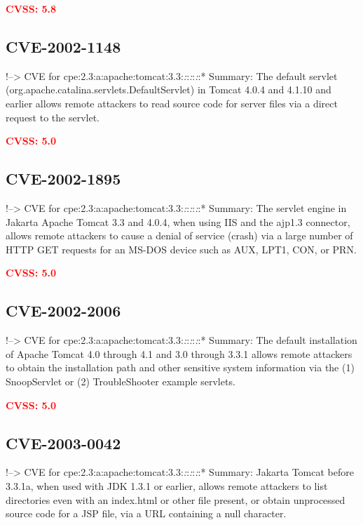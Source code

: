 \documentclass[a4paper, 12pt]{article}
\begin{document}
\textbf{\textcolor{red}{CVSS: 5.8}}

\hypertarget{cve-2002-1148}{%
\subsection{CVE-2002-1148}\label{cve-2002-1148}}

!--\textgreater{} CVE for
cpe:2.3:a:apache:tomcat:3.3:\emph{:}:\emph{:}:\emph{:}:* Summary: The
default servlet (org.apache.catalina.servlets.DefaultServlet) in Tomcat
4.0.4 and 4.1.10 and earlier allows remote attackers to read source code
for server files via a direct request to the servlet.

\textbf{\textcolor{red}{CVSS: 5.0}}

\hypertarget{cve-2002-1895}{%
\subsection{CVE-2002-1895}\label{cve-2002-1895}}

!--\textgreater{} CVE for
cpe:2.3:a:apache:tomcat:3.3:\emph{:}:\emph{:}:\emph{:}:* Summary: The
servlet engine in Jakarta Apache Tomcat 3.3 and 4.0.4, when using IIS
and the ajp1.3 connector, allows remote attackers to cause a denial of
service (crash) via a large number of HTTP GET requests for an MS-DOS
device such as AUX, LPT1, CON, or PRN.

\textbf{\textcolor{red}{CVSS: 5.0}}

\hypertarget{cve-2002-2006}{%
\subsection{CVE-2002-2006}\label{cve-2002-2006}}

!--\textgreater{} CVE for
cpe:2.3:a:apache:tomcat:3.3:\emph{:}:\emph{:}:\emph{:}:* Summary: The
default installation of Apache Tomcat 4.0 through 4.1 and 3.0 through
3.3.1 allows remote attackers to obtain the installation path and other
sensitive system information via the (1) SnoopServlet or (2)
TroubleShooter example servlets.

\textbf{\textcolor{red}{CVSS: 5.0}}

\hypertarget{cve-2003-0042}{%
\subsection{CVE-2003-0042}\label{cve-2003-0042}}

!--\textgreater{} CVE for
cpe:2.3:a:apache:tomcat:3.3:\emph{:}:\emph{:}:\emph{:}:* Summary:
Jakarta Tomcat before 3.3.1a, when used with JDK 1.3.1 or earlier,
allows remote attackers to list directories even with an index.html or
other file present, or obtain unprocessed source code for a JSP file,
via a URL containing a null character.
\end{document}

